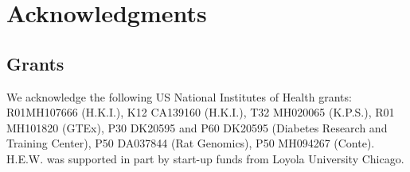 \documentclass[10pt]{article}
\begin{document}
\section*{Acknowledgments}

\subsection*{Grants}\label{grants}

We acknowledge the following US National Institutes of Health grants:
R01MH107666 (H.K.I.), K12 CA139160 (H.K.I.), T32 MH020065 (K.P.S.), R01 MH101820 (GTEx), 
P30 DK20595 and P60 DK20595 (Diabetes Research and
Training Center), P50 DA037844 (Rat Genomics), P50 MH094267 (Conte). H.E.W. was
supported in part by start-up funds from Loyola University Chicago.





\end{document}
